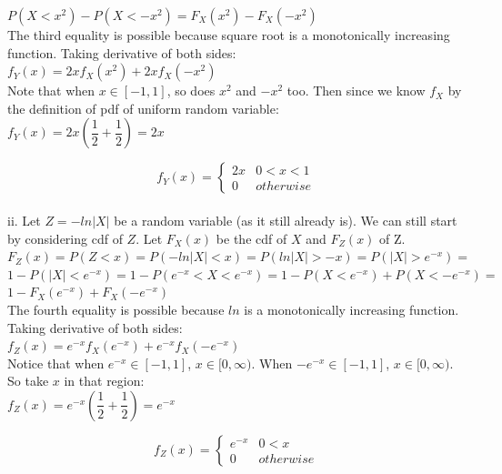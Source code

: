 \documentclass[12pt]{article}
\begin{document}
$P( X < x^2) - P( X < -x^2 ) = F_X(x^2) - F_X(-x^2) $ \\ 


The third equality is possible because square root is a monotonically increasing function. Taking derivative of both sides: \\

$f_Y(x) =2xf_X(x^2)+2xf_X(-x^2)$ \\

Note that when $x\in [-1,1]$, so does $x^2$ and $-x^2$ too. Then since we know $f_X$ by the definition of pdf of uniform random variable:\\

$f_Y(x) = 2x(\dfrac{1}{2}+\dfrac{1}{2})=2x $

\[ f_Y( x ) = \begin{cases} 
		2x & 0 < x < 1        \\
       0 & otherwise
      
   \end{cases}
\] \\


ii. Let $Z= -ln|X|  $ be a random variable (as it still already is). We can still start by considering cdf of $Z$. Let $F_X(x)$ be the cdf of $X$ and $F_Z(x)$ of Z.\\

$F_Z(x) = P(Z<x) = P( -ln|X| < x) = P( ln|X| > -x) =P( |X| > e^{-x} ) =$\\

$ 1 - P( |X| < e^{-x} ) = 1 - P( e^{-x} < X < e^{-x} ) = 1- P( X < e^{-x} ) + P( X < -e^{-x} ) = $\\

$1-F_X(e^{-x}) + F_X(-e^{-x})$\\


The fourth equality is possible because $ln$ is a monotonically increasing function. Taking derivative of both sides: \\

$f_Z(x) =e^{-x}f_X(e^{-x})+ e^{-x} f_X(-e^{-x})$ \\

Notice that when $e^{-x}\in [-1,1]$, $x\in [0,\infty)$. When $-e^{-x}\in [-1,1]$, $x\in [0,\infty)$. So take $x$ in that region:\\

$f_Z(x) =e^{-x}  (\dfrac{1}{2}+\dfrac{1}{2}) =e^{-x} $

\[ f_Z( x ) = \begin{cases} 
		e^{-x} & 0 < x \\
       0 & otherwise
      
   \end{cases}
\] \\
\end{document}
